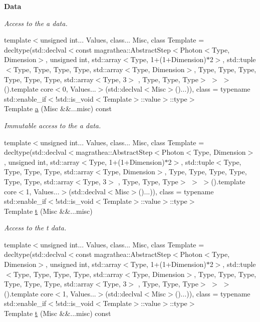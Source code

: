 \begin{Indent}{\bf Data}
\begin{DoxyCompactItemize}
\begin{DoxyCompactList}\small\item\em Access to the a data. \end{DoxyCompactList}\item 
{\footnotesize template$<$unsigned int... Values, class... Misc, class Template  = decltype(std\-::declval$<$const magrathea\-::\-Abstract\-Step$<$\-Photon$<$\-Type, Dimension$>$, unsigned int, std\-::array$<$\-Type, 1+(1+\-Dimension)$\ast$2$>$, std\-::tuple$<$\-Type, Type, Type, Type, std\-::array$<$\-Type, Dimension$>$, Type, Type, Type, Type, Type, Type, std\-::array$<$\-Type, 3$>$ , Type, Type, Type$>$ $>$ $>$().\-template core$<$0, Values...$>$(std\-::declval$<$\-Misc$>$()...)), class  = typename std\-::enable\-\_\-if$<$!std\-::is\-\_\-void$<$\-Template$>$\-::value$>$\-::type$>$ }\\Template \hyperlink{exceptionPhoton_afa267cd6af25cc9a8d16d2b23980ed55}{a} (Misc \&\&...misc) const 
\begin{DoxyCompactList}\small\item\em Immutable access to the a data. \end{DoxyCompactList}\item 
{\footnotesize template$<$unsigned int... Values, class... Misc, class Template  = decltype(std\-::declval$<$magrathea\-::\-Abstract\-Step$<$\-Photon$<$\-Type, Dimension$>$, unsigned int, std\-::array$<$\-Type, 1+(1+\-Dimension)$\ast$2$>$, std\-::tuple$<$\-Type, Type, Type, Type, std\-::array$<$\-Type, Dimension$>$, Type, Type, Type, Type, Type, Type, std\-::array$<$\-Type, 3$>$ , Type, Type, Type$>$ $>$ $>$().\-template core$<$1, Values...$>$(std\-::declval$<$\-Misc$>$()...)), class  = typename std\-::enable\-\_\-if$<$!std\-::is\-\_\-void$<$\-Template$>$\-::value$>$\-::type$>$ }\\Template \hyperlink{exceptionPhoton_ac51f83fe7ee52b304aa20fd4d0c851c7}{t} (Misc \&\&...misc)
\begin{DoxyCompactList}\small\item\em Access to the t data. \end{DoxyCompactList}\item 
{\footnotesize template$<$unsigned int... Values, class... Misc, class Template  = decltype(std\-::declval$<$const magrathea\-::\-Abstract\-Step$<$\-Photon$<$\-Type, Dimension$>$, unsigned int, std\-::array$<$\-Type, 1+(1+\-Dimension)$\ast$2$>$, std\-::tuple$<$\-Type, Type, Type, Type, std\-::array$<$\-Type, Dimension$>$, Type, Type, Type, Type, Type, Type, std\-::array$<$\-Type, 3$>$ , Type, Type, Type$>$ $>$ $>$().\-template core$<$1, Values...$>$(std\-::declval$<$\-Misc$>$()...)), class  = typename std\-::enable\-\_\-if$<$!std\-::is\-\_\-void$<$\-Template$>$\-::value$>$\-::type$>$ }\\Template \hyperlink{exceptionPhoton_a957666d7aff7e07068a19083060137c0}{t} (Misc \&\&...misc) const 

\end{DoxyCompactItemize}
\end{Indent}
